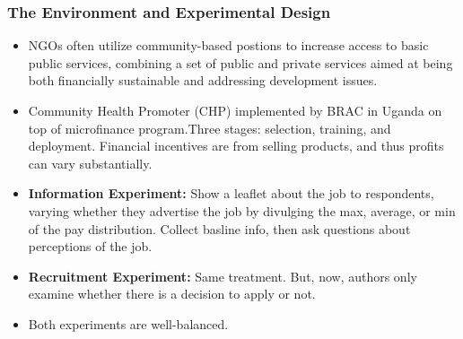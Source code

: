 \documentclass{beamer}
\begin{document}
\begin{frame}
\frametitle{The Environment and Experimental Design}
\footnotesize{
 

 \begin{itemize}
\item NGOs often utilize community-based postions to increase access to basic public services, combining a set of public and private services aimed at being both financially sustainable and addressing development issues. \medskip
\item Community Health Promoter (CHP) implemented by BRAC in Uganda on top of microfinance program.Three stages: selection, training, and deployment. Financial incentives are from selling products, and thus profits can vary substantially. \medskip
\item \textbf{Information Experiment:} Show a leaflet about the job to respondents, varying whether they advertise the job by divulging the max, average, or min of the pay distribution. Collect basline info, then ask questions about perceptions of the job.

\item \textbf{Recruitment Experiment:} Same treatment. But, now, authors only examine whether there is a decision to apply or not.
\item Both experiments are well-balanced.

\end{itemize}

}
\end{frame}
\end{document}
